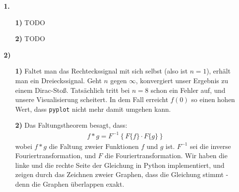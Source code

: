 \documentclass[a4paper,11pt]{article}
\author{\authorinfotitle}
\title{\titleinfo}
\date{\today}
\begin{document}
	\maketitle
	\begin{enumerate}
		\item[\textbf{1.}]
		\begin{enumerate}
			\item[\textbf{1)}]
				TODO
			\item[\textbf{2)}]
				TODO
		\end{enumerate}
		\item[\textbf{2)}]
		\begin{enumerate}
			\item[\textbf{1)}]
				Faltet man das Rechteckssignal mit sich selbst (also ist $n=1$),
				erhält man ein Dreieckssignal.
				Geht $n$ gegen $\infty$, konvergiert unser Ergebnis zu einem
				Dirac-Stoß. Tatsächlich tritt bei $n=8$ schon ein Fehler auf,
				und unsere Visualisierung scheitert. In dem Fall erreicht
				$f(0)$ so einen hohen Wert, dass \texttt{pyplot} nicht mehr
				damit umgehen kann.
			\item[\textbf{2)}]
				Das Faltungstheorem besagt, dass:
				\begin{align*}
					f * g = F^{-1}\left \{ F\{f\} \cdot F\{g\}\right \}
				\end{align*}
				wobei $f * g$ die Faltung zweier Funktionen $f$ und $g$ ist.
				$F^{-1}$ sei die inverse Fouriertransformation, und $F$ die
				Fouriertransformation.
				Wir haben die linke und die rechte Seite der Gleichung in
				Python implementiert, und zeigen durch das Zeichnen zweier Graphen,
				dass die Gleichung stimmt - denn die Graphen überlappen exakt.
    	\end{enumerate}
	\end{enumerate}
\end{document}
